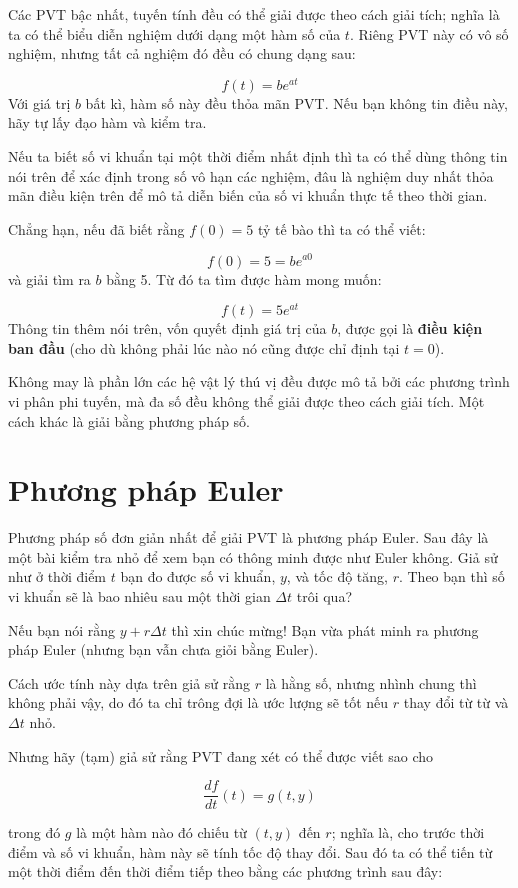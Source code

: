 \documentclass[12pt]{book}
\begin{document}
Các PVT bậc nhất, tuyến tính đều có thể giải được theo cách giải tích;
nghĩa là ta có thể biểu diễn nghiệm dưới dạng một hàm số của $t$.
Riêng PVT này có vô số nghiệm, nhưng tất cả nghiệm đó đều có chung
dạng sau:

\[ f(t) = b e^{at} \]
%
Với giá trị $b$ bất kì, hàm số này đều thỏa mãn PVT. Nếu bạn không 
tin điều này, hãy tự lấy đạo hàm và kiểm tra.

Nếu ta biết số vi khuẩn tại một thời điểm nhất định thì ta có thể dùng
thông tin nói trên để xác định trong số vô hạn các nghiệm, đâu là
nghiệm duy nhất thỏa mãn điều kiện trên để mô tả diễn biến của
số vi khuẩn thực tế theo thời gian.

Chẳng hạn, nếu đã biết rằng $f(0) = 5$ tỷ tế bào thì ta có thể viết:

\[ f(0) = 5 = b e^{a 0} \]
%
và giải tìm ra $b$ bằng 5. Từ đó ta tìm được hàm mong muốn:

\[ f(t) = 5 e^{at} \]
%
Thông tin thêm nói trên, vốn quyết định giá trị của $b$, được
gọi là {\bf điều kiện ban đầu} (cho dù không phải lúc nào nó
cũng được chỉ định tại $t=0$).

Không may là phần lớn các hệ vật lý thú vị đều được mô tả bởi
các phương trình vi phân phi tuyến, mà đa số đều không thể
giải được theo cách giải tích. Một cách khác là giải bằng phương pháp
số.


\section{Phương pháp Euler}

Phương pháp số đơn giản nhất để giải PVT là phương pháp Euler.
Sau đây là một bài kiểm tra nhỏ để xem bạn có thông minh được như
Euler không. Giả sử như ở thời điểm $t$ bạn đo được số vi khuẩn, 
$y$, và tốc độ tăng, $r$. Theo bạn thì số vi khuẩn sẽ là bao nhiêu
sau một thời gian $\Delta t$ trôi qua?

Nếu bạn nói rằng $y + r \Delta t$ thì xin chúc mừng! Bạn vừa 
phát minh ra phương pháp Euler (nhưng bạn vẫn chưa giỏi bằng Euler).

Cách ước tính này dựa trên giả sử rằng $r$ là hằng số, nhưng
nhình chung thì không phải vậy, do đó ta chỉ trông đợi là ước lượng
sẽ tốt nếu $r$ thay đổi từ từ và $\Delta t$ nhỏ.

Nhưng hãy (tạm) giả sử rằng PVT đang xét có thể được viết sao cho

\[ \frac{df}{dt}(t) = g(t, y) \]

\noindent trong đó $g$ là một hàm nào đó chiếu từ $(t, y)$ đến $r$; nghĩa là,
cho trước thời điểm và số vi khuẩn, hàm này sẽ tính tốc độ thay đổi.
Sau đó ta có thể tiến từ một thời điểm đến thời điểm tiếp theo bằng
các phương trình sau đây:
\end{document}
